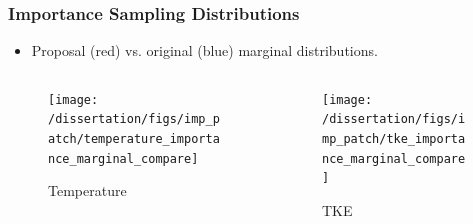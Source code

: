 \documentclass[t, pdftex]{beamer}
\begin{document}
\begin{frame}
\frametitle{Importance Sampling Distributions}

\begin{itemize}
    \item {\color{utred} Proposal (red)} vs. {\color{utblue} original (blue)} marginal distributions.
\end{itemize}
\vspace{-18pt}
\begin{columns}
    \begin{column}{0.5\textwidth}
\begin{figure}[]
\centering
\texttt{[image: /dissertation/figs/imp\_patch/temperature\_importance\_marginal\_compare]}
\caption{\centering Temperature}
\label{model_overview}
\end{figure}
\end{column}
\begin{column}{0.5\textwidth}
\begin{figure}[]
\centering
\texttt{[image: /dissertation/figs/imp\_patch/tke\_importance\_marginal\_compare]}\\
\caption{\centering TKE}
\label{model_overview}
\end{figure}
\end{column}
\end{columns}
\end{frame}
\end{document}

